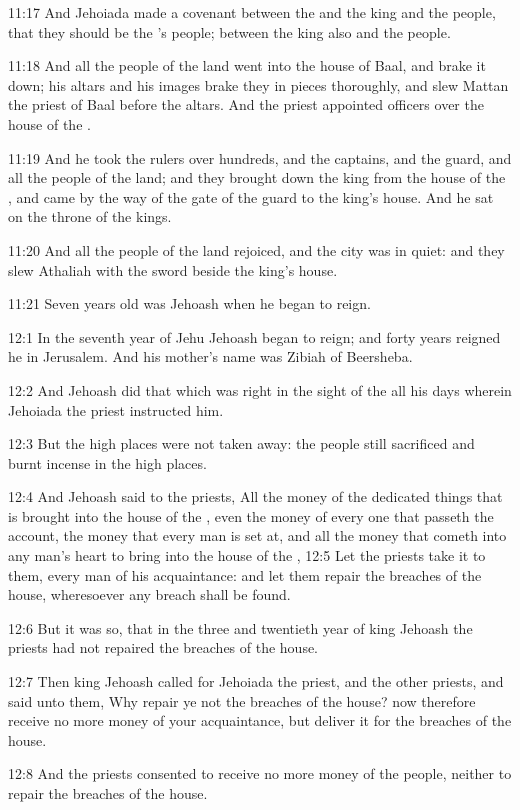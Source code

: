 11:17 And Jehoiada made a covenant between the \LORD and the king and the people, that they should be the \LORD's people; between the king also and the people.

11:18 And all the people of the land went into the house of Baal, and brake it down; his altars and his images brake they in pieces thoroughly, and slew Mattan the priest of Baal before the altars. And the priest appointed officers over the house of the \LORD.

11:19 And he took the rulers over hundreds, and the captains, and the guard, and all the people of the land; and they brought down the king from the house of the \LORD, and came by the way of the gate of the guard to the king's house. And he sat on the throne of the kings.

11:20 And all the people of the land rejoiced, and the city was in quiet: and they slew Athaliah with the sword beside the king's house.

11:21 Seven years old was Jehoash when he began to reign.

12:1 In the seventh year of Jehu Jehoash began to reign; and forty years reigned he in Jerusalem. And his mother's name was Zibiah of Beersheba.

12:2 And Jehoash did that which was right in the sight of the \LORD all his days wherein Jehoiada the priest instructed him.

12:3 But the high places were not taken away: the people still sacrificed and burnt incense in the high places.

12:4 And Jehoash said to the priests, All the money of the dedicated things that is brought into the house of the \LORD, even the money of every one that passeth the account, the money that every man is set at, and all the money that cometh into any man's heart to bring into the house of the \LORD, 12:5 Let the priests take it to them, every man of his acquaintance: and let them repair the breaches of the house, wheresoever any breach shall be found.

12:6 But it was so, that in the three and twentieth year of king Jehoash the priests had not repaired the breaches of the house.

12:7 Then king Jehoash called for Jehoiada the priest, and the other priests, and said unto them, Why repair ye not the breaches of the house? now therefore receive no more money of your acquaintance, but deliver it for the breaches of the house.

12:8 And the priests consented to receive no more money of the people, neither to repair the breaches of the house.

